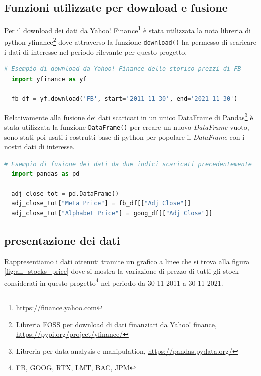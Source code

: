 \documentclass{article}
\begin{document}
\pagebreak

\subsection{Funzioni utilizzate per download e fusione}

Per il download dei dati da Yahoo! Finance\footnote{\href{https://finance.yahoo.com}{https://finance.yahoo.com}} è stata utilizzata la nota libreria di python
yfinance\footnote{Libreria FOSS per download di dati finanziari da Yahoo! finance, \href{https://pypi.org/project/yfinance/}{https://pypi.org/project/yfinance/}} dove attraverso la funzione
\verb|download()| ha permesso di scaricare i dati di interesse nel periodo rilevante per questo progetto.

\begin{lstlisting}[language=Python]
  # Esempio di download da Yahoo! Finance dello storico prezzi di FB
  import yfinance as yf

  fb_df = yf.download('FB', start='2011-11-30', end='2021-11-30')
\end{lstlisting}

Relativamente alla fusione dei dati scaricati in un unico DataFrame di Pandas\footnote{Libreria per data analysis e manipulation, 
\href{https://pandas.pydata.org/}{https://pandas.pydata.org/}} è stata utilizzata la funzione \verb|DataFrame()| 
per creare un nuovo \emph{DataFrame} vuoto, sono stati poi usati i costrutti base di python per popolare il \emph{DataFrame} con i nostri dati di interesse.

\begin{lstlisting}[language=Python]
  # Esempio di fusione dei dati da due indici scaricati precedentemente
  import pandas as pd

  adj_close_tot = pd.DataFrame()
  adj_close_tot["Meta Price"] = fb_df[["Adj Close"]]
  adj_close_tot["Alphabet Price"] = goog_df[["Adj Close"]]
\end{lstlisting}

\subsection{presentazione dei dati}

Rappresentiamo i dati ottenuti tramite un grafico a linee che si trova alla figura \ref{fig:all_stocks_price} dove 
si mostra la variazione di prezzo di tutti gli stock considerati in questo progetto\footnote{FB, GOOG, RTX, LMT, BAC, JPM} nel periodo 
da 30-11-2011 a 30-11-2021.
\end{document}

